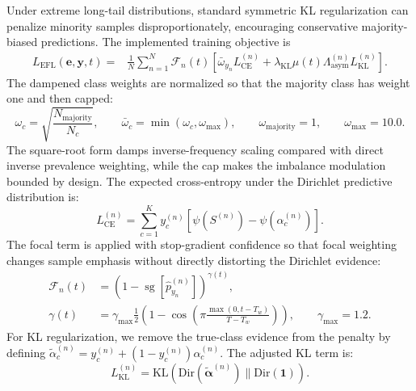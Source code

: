 \documentclass[letterpaper]{article} %
\newcommand{\Dir}{\text{Dir}}
\newcommand{\KL}{\text{KL}}
\begin{document}
Under extreme long-tail distributions, standard symmetric KL regularization can penalize minority samples disproportionately, encouraging conservative majority-biased predictions. The implemented training objective is
\begin{equation}\label{eq:efl}
\begin{aligned}
    L_{\text{EFL}}(\bm{e}, \bm{y}, t) ={}& \frac{1}{N} \sum_{n=1}^N
    \mathcal{F}_n(t)
    \left[
    \bar{\omega}_{y_n}L_{\text{CE}}^{(n)}
    + \lambda_{\text{KL}}\mu(t)
    \Lambda_{\text{asym}}^{(n)}
    L_{\text{KL}}^{(n)}
    \right].
\end{aligned}
\end{equation}
The dampened class weights are normalized so that the majority class has weight one and then capped:
\begin{equation}\label{eq:sample_weight}
    \omega_c=\sqrt{\frac{N_{\text{majority}}}{N_c}},
    \qquad
    \bar{\omega}_c=\min(\omega_c,\omega_{\max}),
    \qquad
    \omega_{\text{majority}}=1,
    \qquad
    \omega_{\max}=10.0 .
\end{equation}
The square-root form damps inverse-frequency scaling compared with direct inverse prevalence weighting, while the cap makes the imbalance modulation bounded by design. The expected cross-entropy under the Dirichlet predictive distribution is:
\begin{equation}\label{eq:dirichlet_ce}
    L_{\text{CE}}^{(n)}
    = \sum_{c=1}^K y_c^{(n)}
    \left[\psi(S^{(n)})-\psi(\alpha_c^{(n)})\right].
\end{equation}
The focal term is applied with stop-gradient confidence so that focal weighting changes sample emphasis without directly distorting the Dirichlet evidence:
\begin{equation}\label{eq:focal_schedule}
\begin{aligned}
    \mathcal{F}_n(t)
    &= \left(1-\operatorname{sg}\!\left[\hat{p}_{y_n}^{(n)}\right]\right)^{\gamma(t)},\\
    \gamma(t)
    &= \gamma_{\max}\frac{1}{2}\left(1-\cos\left(\pi
    \frac{\max(0,t-T_w)}{T-T_w}\right)\right),
    \qquad \gamma_{\max}=1.2 .
\end{aligned}
\end{equation}
For KL regularization, we remove the true-class evidence from the penalty by defining
$\tilde{\alpha}_c^{(n)}=y_c^{(n)}+(1-y_c^{(n)})\alpha_c^{(n)}$. The adjusted KL term is:
\begin{equation}\label{eq:kl_loss_main}
    L_{\text{KL}}^{(n)}
    =
    \KL\!\left(\Dir(\tilde{\bm{\alpha}}^{(n)})\parallel\Dir(\mathbf{1})\right).
\end{equation}
\end{document}
